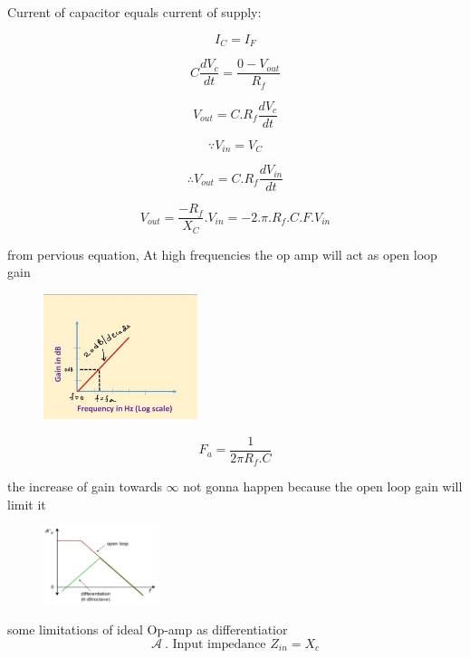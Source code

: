 \documentclass{article}
\begin{document}
    Current of capacitor equals current of supply:
    
    \[
    I_{C} = I_F
    \]
    
    \[
    C \frac{dV_c}{dt} = \frac{0-V_{out}}{R_f}   
    \]
    
    \[
    V_{out} = C.R_f\frac{dV_c}{dt}
    \]
    
    \[
    \because V_{in} = V_C
    \]
    
    \[
    \therefore V_{out} = C.R_f\frac{dV_{in}}{dt}
    \]
    
    \[
    V_{out}=\frac{-R_f}{X_C}.V_{in} = -2.\pi .R_f.C.F.V_{in}
    \]
    
    from pervious equation, At high frequencies the op amp will act as open loop gain
    \begin{figure}[h]
        \centering
        \includegraphics[width=0.4\textwidth]{ideal.jpg}
    \end{figure}
    
    \[
    F_a=\frac{1}{2\pi R_f.C}
    \]
    
    the increase of gain towards \(\infty\) not gonna happen because the open loop gain will limit it
    \begin{figure}[h]
        \centering
        \includegraphics[width=0.3\textwidth]{practical.png}
    \end{figure}

some limitations of ideal Op-amp as differentiatior
\[
\mathcal{A} \ \text{. Input impedance } Z_{in} = X_c
\]
\\
\end{document}
